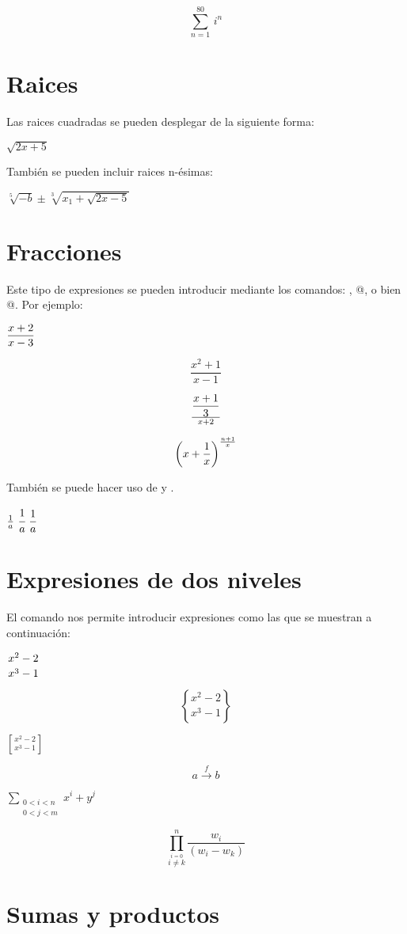 \documentclass[letterpaper,12pt]{article}
\begin{document}
$$ \sum_{n=1}^{80} \, i^n $$

\section{Raices}

Las raices cuadradas se pueden desplegar de la siguiente forma:

$\displaystyle \sqrt{2 x + 5}$

También se pueden incluir raices n-ésimas:

$\displaystyle \sqrt[5]{-b} \pm \sqrt[3]{x_1 + \sqrt{2 x -5}}$

\section{Fracciones}

Este tipo de expresiones se pueden introducir mediante los comandos: \verb@\over@, \verb@\frac{}{}@, o bien \verb@{ \atop }@. Por ejemplo:

$\displaystyle {x+2 \over x-3}$

\[ \frac{x^2 + 1}{x-1}\]

\[ {{x + 1}\over{3}} \over {x+2} \]

$$\displaystyle{\left( x + {1 \over x} \right)^{n+1 \over x}}$$

También se puede hacer uso de \verb@\cfrac@ y \verb@\dfrac@.

$\frac{1}{a} \,\, \cfrac{1}{a} \,\, \dfrac{1}{a}$

\section{Expresiones de dos niveles}

El comando \verb@\atop@ nos permite introducir expresiones como las que se muestran a continuación:

$\displaystyle {x^2-2 \atop x^3-1}$

$$\displaystyle {x^2-2 \brace x^3-1}$$

$\displaystyle {x^2-2 \brack x^3-1}$

$$\displaystyle{a \stackrel{f}{\rightarrow} b}$$

$\displaystyle{\sum_{\substack{0<i<n\\0<j<m}} x^i + y^j}$

\[ \prod_{\overset{i=0}{i\neq k}}^{n}\frac{w_i}{(w_i-w_k)} \]

\section{Sumas y productos}
\end{document}
